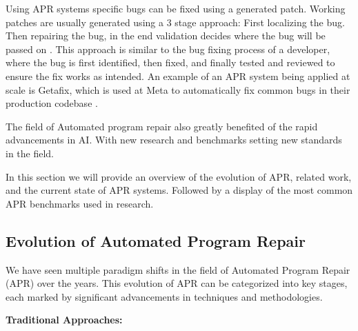Using APR systems specific bugs can be fixed using a generated patch. Working patches are usually generated using a 3 stage approach: First localizing the bug. Then repairing the bug, in the end validation decides where the bug will be passed on \cite{zhangSurveyLearningbasedAutomated2024, baderGetafixLearningFix2019}. This approach is similar to the bug fixing process of a developer, where the bug is first identified, then fixed, and finally tested and reviewed to ensure the fix works as intended. An example of an APR system being applied at scale is Getafix, which is used at Meta to automatically fix common bugs in their production codebase \cite{baderGetafixLearningFix2019}.

The field of Automated program repair also greatly benefited of the rapid advancements in AI. With new research and benchmarks setting new standards in the field.\cite{puvvadiCodingAgentsComprehensive2025,houLargeLanguageModels2024}

In this section we will provide an overview of the evolution of APR, related work, and the current state of APR systems. Followed by a display of the most common APR benchmarks used in research.

\subsection{Evolution of Automated Program Repair} \label{subsection:evolution-apr}

We have seen multiple paradigm shifts in the field of Automated Program Repair (APR) over the years. This evolution of APR can be categorized into key stages, each marked by significant advancements in techniques and methodologies.

\textbf{Traditional Approaches:}

